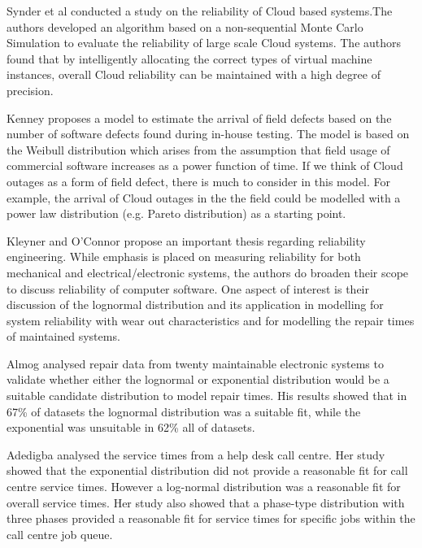 \documentclass[5p]{elsarticle}
\begin{document}
Synder et al \cite{snyder2015evaluation} conducted a study on the reliability of Cloud based systems.The authors developed an algorithm based on a non-sequential Monte Carlo Simulation to evaluate the reliability of large scale Cloud systems. The authors found that by intelligently allocating the correct types of virtual machine instances, overall Cloud reliability can be maintained with a high degree of precision. \par

Kenney \cite{kenny1993estimating} proposes a model to estimate the arrival of field defects based on the number of software defects found during in-house testing. The model is based on the Weibull distribution which arises from the assumption that field usage of commercial software increases as a power function of time. If we think of Cloud outages as a form of field defect, there is much to consider in this model. For example, the arrival of Cloud outages in the the field could be modelled with a power law distribution (e.g. Pareto distribution) as a starting point. \par 

Kleyner and O'Connor \cite{o2011practical} propose an important thesis regarding reliability engineering. While emphasis is placed on measuring reliability for both mechanical and electrical/electronic systems, the authors do broaden their scope to discuss reliability of computer software. One aspect of interest is their discussion of the lognormal distribution and its application in modelling for system reliability with wear out characteristics and for modelling the repair times of maintained systems. \par

Almog \cite{almog1979study} analysed repair data from twenty maintainable electronic systems to validate whether either the lognormal or exponential distribution would be a suitable candidate distribution to model repair times. His results showed that in 67\% of datasets the lognormal distribution was a suitable fit, while the exponential was unsuitable in 62\% all of datasets. \par

Adedigba \cite{adedigba2005statistical} analysed the service times from a help desk call centre. Her study showed that the exponential distribution did not provide a reasonable fit for call centre service times. However a log-normal distribution was a reasonable fit for overall service times. Her study also showed that a phase-type distribution with three phases provided a reasonable fit for service times for specific jobs within the call centre job queue. \par
\end{document}
